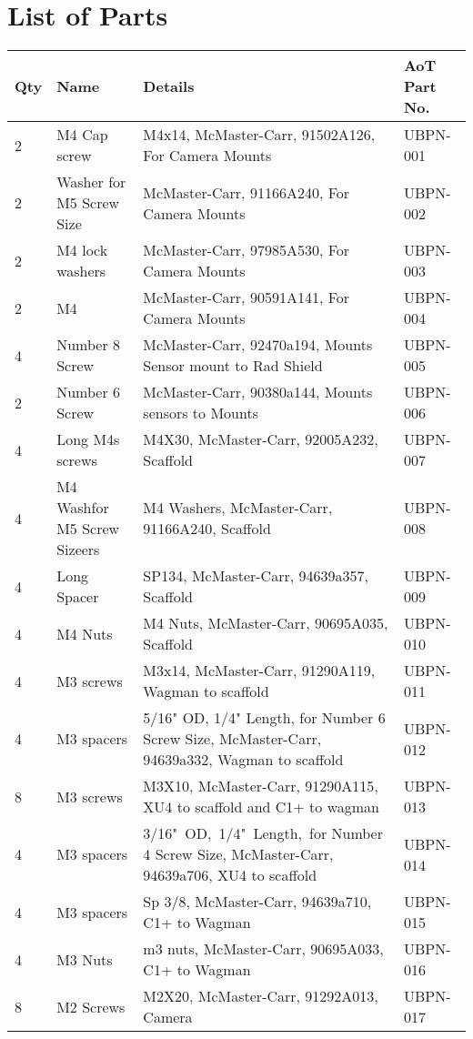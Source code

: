 
\section{List of Parts}
\begin{longtable}{|p{}|p{}|p{}|p{}|}
\hline
\textbf{Qty} & \textbf{Name} & \textbf{Details} & \textbf{AoT Part No.} \\ \hline
2 & M4 Cap screw & M4x14, McMaster-Carr, 91502A126, For Camera Mounts & UBPN-001\\ \hline
2 & Washer for M5 Screw Size & McMaster-Carr, 91166A240, For Camera Mounts & UBPN-002\\ \hline
2 & M4 lock washers & McMaster-Carr, 97985A530, For Camera Mounts & UBPN-003\\ \hline
2 & M4 & McMaster-Carr, 90591A141, For Camera Mounts & UBPN-004\\ \hline
4 & Number 8 Screw & McMaster-Carr, 92470a194, Mounts Sensor mount to Rad Shield & UBPN-005\\ \hline
2 & Number 6 Screw & McMaster-Carr, 90380a144, Mounts sensors to Mounts & UBPN-006\\ \hline
4 & Long M4s screws & M4X30, McMaster-Carr, 92005A232, Scaffold & UBPN-007\\ \hline
4 & M4 Washfor M5 Screw Sizeers & M4 Washers, McMaster-Carr, 91166A240, Scaffold & UBPN-008\\ \hline
4 & Long Spacer & SP134, McMaster-Carr, 94639a357, Scaffold & UBPN-009\\ \hline
4 & M4 Nuts & M4 Nuts, McMaster-Carr, 90695A035, Scaffold & UBPN-010\\ \hline
4 & M3 screws & M3x14, McMaster-Carr, 91290A119, Wagman to scaffold & UBPN-011\\ \hline
4 & M3 spacers & 5/16" OD, 1/4" Length, for Number 6 Screw Size, McMaster-Carr, 94639a332, Wagman to scaffold & UBPN-012\\ \hline
8 & M3 screws & M3X10, McMaster-Carr, 91290A115, XU4 to scaffold and C1+ to wagman & UBPN-013\\ \hline
4 & M3 spacers & 3/16" OD, 1/4" Length, for Number 4 Screw Size, McMaster-Carr, 94639a706, XU4 to scaffold & UBPN-014\\ \hline
4 & M3 spacers & Sp 3/8, McMaster-Carr, 94639a710, C1+ to Wagman & UBPN-015\\ \hline
4 & M3 Nuts & m3 nuts, McMaster-Carr, 90695A033, C1+ to Wagman & UBPN-016\\ \hline
8 & M2 Screws & M2X20, McMaster-Carr, 91292A013, Camera & UBPN-017\\ \hline

\end{longtable}
